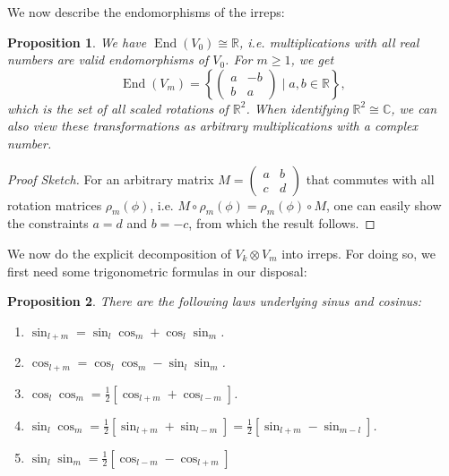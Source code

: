 \documentclass[12pt, a4paper]{article}
\theoremstyle{plain}
\newtheorem{pro}{Proposition}[section]
\theoremstyle{definition}
\theoremstyle{remark}
\newcommand{\R}{\mathds{R}}
\newcommand{\C}{\mathds{C}}
\DeclareMathOperator{\End}{End}
\begin{document}
We now describe the endomorphisms of the irreps:

\begin{pro}\label{endomorphisms}
We have $\End(V_0) \cong \R$, i.e. multiplications with all real numbers are valid endomorphisms of $V_0$. For $m \geq 1$, we get
\begin{equation*}
\End(V_m) = \left\lbrace \begin{pmatrix} a & -b \\ b & a \end{pmatrix} \mid a, b \in \R \right\rbrace,
\end{equation*}
which is the set of all scaled rotations of $\R^2$. When identifying $\R^2 \cong \C$, we can also view these transformations as arbitrary multiplications with a complex number.
\end{pro}

\begin{proof}[Proof Sketch]
For an arbitrary matrix $M = \begin{pmatrix} a & b \\ c & d\end{pmatrix}$ that commutes with all rotation matrices $\rho_m(\phi)$, i.e. $M \circ \rho_m(\phi) = \rho_m(\phi) \circ M$, one can easily show the constraints $a = d$ and $b = -c$, from which the result follows. 
\end{proof}

We now do the explicit decomposition of $V_k \otimes V_m$ into irreps. For doing so, we first need some trigonometric formulas in our disposal:

\begin{pro}\label{trigonometric formulas}
There are the following laws underlying sinus and cosinus:
\begin{enumerate}
\item $\sin_{l+m} = \sin_l \cos_m + \cos_l \sin_m$.
\item $\cos_{l+m} = \cos_l\cos_m - \sin_l \sin_m$.
\item $\cos_l \cos_m = \frac{1}{2} \left[ \cos_{l+m} + \cos_{l-m} \right]$.
\item $\sin_l \cos_m = \frac{1}{2} \left[  \sin_{l+m} + \sin_{l-m} \right] = \frac{1}{2} \left[ \sin_{l+m} - \sin_{m - l}\right]$.
\item $\sin_l \sin_m = \frac{1}{2} \left[ \cos_{l-m} - \cos_{l+m} \right]$
\end{enumerate}
\end{pro}
\end{document}
